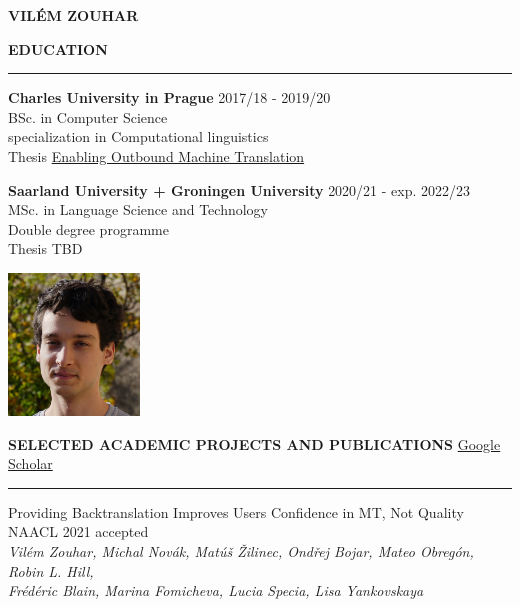 \documentclass[11pt,a4paper]{article} %
\newcommand{\hSection}[1]{
    \medskip
    \MakeUppercase{\bf #1}
    \medskip
    \hrule
}
\newcommand{\hSectionI}[2]{
    \medskip
    \MakeUppercase{\bf #1}
    \hfill
    #2
    \medskip
    \hrule
}
\newcommand{\hSubsectionB}[3]{
    {#1} \hfill {#2}\hspace{-1cm}\\
    \vspace{-0.2cm} \hspace{-0.17cm}\textit{\footnotesize #3}
    \vspace{0.1cm}
}
\begin{document}
\begin{center}
    {\LARGE \bf VILÉM ZOUHAR} \\
    {\large \href{mailto:vilem.zouhar@gmail.com}{\color{black}{vilem.zouhar@gmail.com}}}
\end{center}

\vspace{\baselineskip}

\begin{minipage}{0.75\textwidth}
\hSection{Education}\vspace{0.2cm}
{\bf Charles University in Prague} \hfill {2017/18 - 2019/20} \\
BSc. in Computer Science \\
specialization in Computational linguistics \\
Thesis \href{https://dspace.cuni.cz/bitstream/handle/20.500.11956/119400/130284419.pdf?sequence=1&isAllowed=y}{Enabling Outbound Machine Translation}

\vspace{\baselineskip}

{\bf Saarland University\hspace{-0.1cm} +\hspace{-0.1cm} Groningen University} \hfill {2020/21 - exp. 2022/23} \\
MSc. in Language Science and Technology \\
Double degree programme \\
Thesis TBD
\end{minipage}
% 
% 
\begin{minipage}{0.25\textwidth}
    \center
    \vspace{-1cm}
    \hfill
    \includegraphics[width=3.5cm]{portrait.jpg}
    \vspace{-0.9cm}
\end{minipage}

\hSectionI{Selected Academic Projects and Publications}{\href{https://scholar.google.com/citations?user=2EUDwtkAAAAJ}{Google Scholar}\hspace{-1.12cm}}

\hSubsectionB
{Providing Backtranslation Improves Users Confidence in MT, Not Quality}
{NAACL 2021 accepted}
{Vilém Zouhar, Michal Novák, Matúš Žilinec, Ondřej Bojar, Mateo Obregón, Robin L. Hill,\\ Frédéric Blain, Marina Fomicheva, Lucia Specia, Lisa Yankovskaya}
\vspace{-0.11cm}
\end{document}
